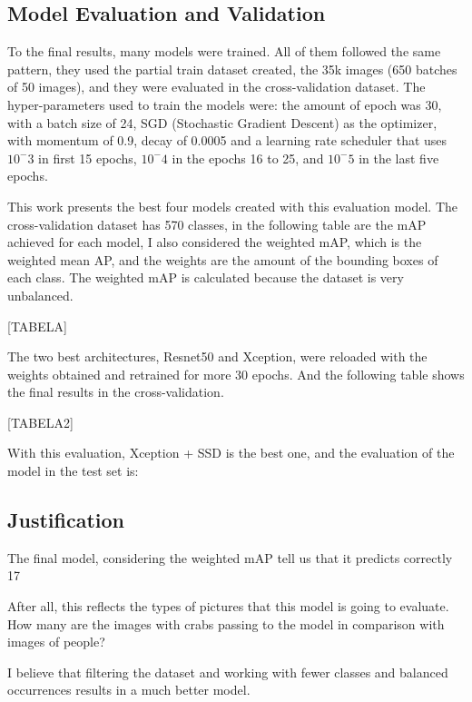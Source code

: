 \documentclass[11pt, a4paper, twocolumn]{article}
\begin{document}
\subsection{Model Evaluation and Validation}


To the final results, many models were trained. All of them followed the same pattern, they used the partial train dataset created, the 35k images (650 batches of 50 images), and they were evaluated in the cross-validation dataset. The hyper-parameters used to train the models were: the amount of epoch was 30, with a batch size of 24, SGD (Stochastic Gradient Descent) as the optimizer, with momentum of 0.9, decay of 0.0005 and a learning rate scheduler that uses $10^-3$ in first 15 epochs, $10^-4$ in the epochs 16 to 25, and $10^-5$ in the last five epochs.

This work presents the best four models created with this evaluation model. The cross-validation dataset has 570 classes, in the following table are the mAP achieved for each model, I also considered the weighted mAP, which is the weighted mean AP, and the weights are the amount of the bounding boxes of each class. The weighted mAP is calculated because the dataset is very unbalanced.

[TABELA]

The two best architectures, Resnet50 and Xception, were reloaded with the weights obtained and retrained for more 30 epochs. And the following table shows the final results in the cross-validation.

[TABELA2]

With this evaluation, Xception + SSD is the best one, and the evaluation of the model in the test set is:

\subsection{Justification}

The final model, considering the weighted mAP tell us that it predicts correctly 17%

After all, this reflects the types of pictures that this model is going to evaluate. How many are the images with crabs passing to the model in comparison with images of people?

I believe that filtering the dataset and working with fewer classes and balanced occurrences results in a much better model.
\end{document}
